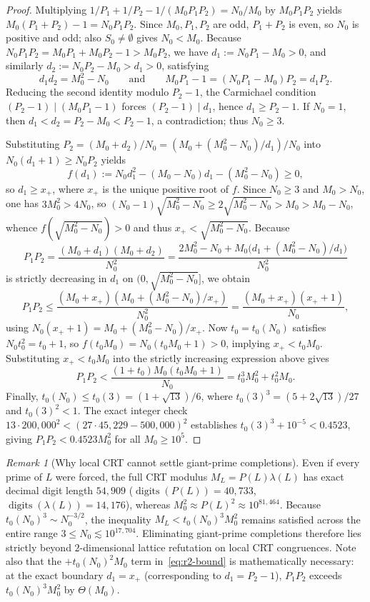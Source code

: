 \documentclass[11pt]{article}
\theoremstyle{remark}
\newtheorem{remark}[theorem]{Remark}
\begin{document}
\begin{proof}
Multiplying $1/P_1 + 1/P_2 - 1/(M_0 P_1 P_2) = N_0 / M_0$ by $M_0 P_1 P_2$ yields
$M_0(P_1 + P_2) - 1 = N_0 P_1 P_2$. Since $M_0, P_1, P_2$ are odd, $P_1 + P_2$
is even, so $N_0$ is positive and odd; also $S_0 \neq \emptyset$ gives $N_0 < M_0$.
Because $N_0 P_1 P_2 = M_0 P_1 + M_0 P_2 - 1 > M_0 P_2$, we have
$d_1 := N_0 P_1 - M_0 > 0$, and similarly $d_2 := N_0 P_2 - M_0 > d_1 > 0$,
satisfying
\[
  d_1 d_2 = M_0^2 - N_0
  \qquad\text{and}\qquad
  M_0 P_1 - 1 = (N_0 P_1 - M_0) P_2 = d_1 P_2.
\]
Reducing the second identity modulo $P_2 - 1$, the Carmichael condition
$(P_2 - 1) \mid (M_0 P_1 - 1)$ forces $(P_2 - 1) \mid d_1$, hence
$d_1 \ge P_2 - 1$. If $N_0 = 1$, then $d_1 < d_2 = P_2 - M_0 < P_2 - 1$, a
contradiction; thus $N_0 \ge 3$.

Substituting $P_2 = (M_0 + d_2)/N_0 = (M_0 + (M_0^2 - N_0)/d_1)/N_0$ into
$N_0(d_1 + 1) \ge N_0 P_2$ yields
\[
  f(d_1) := N_0 d_1^2 - (M_0 - N_0) d_1 - (M_0^2 - N_0) \ge 0,
\]
so $d_1 \ge x_+$, where $x_+$ is the unique positive root of $f$. Since
$N_0 \ge 3$ and $M_0 > N_0$, one has $3M_0^2 > 4N_0$, so
$(N_0 - 1)\sqrt{M_0^2 - N_0} \ge 2\sqrt{M_0^2 - N_0} > M_0 > M_0 - N_0$,
whence $f(\sqrt{M_0^2 - N_0}) > 0$ and thus $x_+ < \sqrt{M_0^2 - N_0}$. Because
\[
  P_1 P_2 = \frac{(M_0 + d_1)(M_0 + d_2)}{N_0^2}
          = \frac{2M_0^2 - N_0 + M_0\bigl(d_1 + (M_0^2 - N_0)/d_1\bigr)}{N_0^2}
\]
is strictly decreasing in $d_1$ on $(0, \sqrt{M_0^2 - N_0}]$, we obtain
\[
  P_1 P_2 \le \frac{(M_0 + x_+)(M_0 + (M_0^2 - N_0)/x_+)}{N_0^2}
          = \frac{(M_0 + x_+)(x_+ + 1)}{N_0},
\]
using $N_0(x_+ + 1) = M_0 + (M_0^2 - N_0)/x_+$. Now $t_0 = t_0(N_0)$ satisfies
$N_0 t_0^2 = t_0 + 1$, so $f(t_0 M_0) = N_0(t_0 M_0 + 1) > 0$, implying
$x_+ < t_0 M_0$. Substituting $x_+ < t_0 M_0$ into the strictly increasing
expression above gives
\[
  P_1 P_2 < \frac{(1 + t_0) M_0 (t_0 M_0 + 1)}{N_0}
          = t_0^3 M_0^2 + t_0^2 M_0.
\]
Finally, $t_0(N_0) \le t_0(3) = (1 + \sqrt{13})/6$, where
$t_0(3)^3 = (5 + 2\sqrt{13})/27$ and $t_0(3)^2 < 1$. The exact integer check
$13 \cdot 200{,}000^2 < (27 \cdot 45{,}229 - 500{,}000)^2$ establishes
$t_0(3)^3 + 10^{-5} < 0.4523$, giving $P_1 P_2 < 0.4523 M_0^2$ for all
$M_0 \ge 10^5$.
\end{proof}

\begin{remark}[Why local CRT cannot settle giant-prime completions]
Even if every prime of $L$ were forced, the full CRT modulus
$M_L = P(L)\lambda(L)$ has exact decimal digit length $54{,}909$
($\operatorname{digits}(P(L)) = 40{,}733$, $\operatorname{digits}(\lambda(L)) = 14{,}176$),
whereas $M_0^2 \approx P(L)^2 \approx 10^{81{,}464}$. Because
$t_0(N_0)^3 \sim N_0^{-3/2}$, the inequality $M_L < t_0(N_0)^3 M_0^2$ remains
satisfied across the entire range $3 \le N_0 \lesssim 10^{17{,}704}$. Eliminating
giant-prime completions therefore lies strictly beyond $2$-dimensional lattice
refutation on local CRT congruences. Note also that the $+t_0(N_0)^2 M_0$ term
in~\eqref{eq:r2-bound} is mathematically necessary: at the exact boundary
$d_1 = x_+$ (corresponding to $d_1 = P_2 - 1$), $P_1 P_2$ exceeds
$t_0(N_0)^3 M_0^2$ by $\Theta(M_0)$.
\end{remark}
\end{document}
